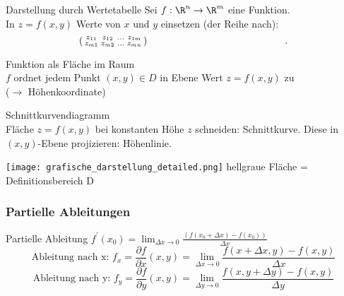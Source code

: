 \begin{concept}{Darstellung durch Wertetabelle}
    Sei $f: \R^n \to \R^m$ eine Funktion.\\
    In $z = f(x,y)$ Werte von $x$ und $y$ einsetzen (der Reihe nach): \\
    $$\begin{psmallmatrix} z_{11} & z_{12} & \ldots & z_{1m} \\ z_{m1} & z_{m2} & \ldots & z_{mn} \end{psmallmatrix} \quad\quad\quad\quad\quad\quad\quad\quad\quad\quad\quad\quad\quad\quad.$$
\end{concept}

\begin{minipage}{0.5\linewidth}
\begin{concept}{Funktion als Fläche im Raum}\\
    $f$ ordnet jedem Punkt $(x, y) \in D$ in Ebene Wert $z=f(x, y)$ zu \\($\rightarrow$ Höhenkoordinate)    
\end{concept}

\begin{concept}{Schnittkurvendiagramm}\\
    Fläche $z=f(x, y)$ bei konstanten Höhe $z$ schneiden: Schnittkurve. 
    Diese in $(x, y)$-Ebene projizieren: Höhenlinie.
\end{concept}
\end{minipage}
\begin{minipage}{0.5\linewidth}
\vspace{-8mm}
\texttt{[image: grafische\_darstellung\_detailed.png]}
\small hellgraue Fläche = Definitionsbereich D
\end{minipage}

\subsubsection{Partielle Ableitungen}

\begin{theorem}{Partielle Ableitung}
$
f^{\prime}(x_0)=\lim _{\Delta x \rightarrow 0} \frac{(f(x_0+\Delta x)-f(x_0))}{\Delta x}
$
$$\text{Ableitung nach x: } f_x=\frac{\partial f}{\partial x}(x, y)=\lim _{\Delta x \rightarrow 0} \frac{f(x+\Delta x, y)-f(x, y)}{\Delta x}$$
$$\text{Ableitung nach y: } f_y=\frac{\partial f}{\partial y}(x, y)=\lim _{\Delta y \rightarrow 0} \frac{f(x, y+\Delta y)-f(x, y)}{\Delta y}$$
\end{theorem}



